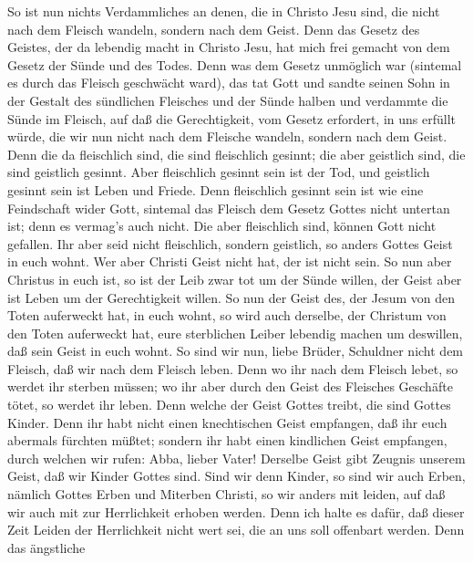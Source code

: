 So ist nun nichts Verdammliches an denen, die in Christo
Jesu sind, die nicht nach dem Fleisch wandeln, sondern nach dem Geist.
 Denn das Gesetz des Geistes, der da lebendig macht in
Christo Jesu, hat mich frei gemacht von dem Gesetz der Sünde und des
Todes.  Denn was dem Gesetz unmöglich war (sintemal es durch
das Fleisch geschwächt ward), das tat Gott und sandte seinen Sohn in der
Gestalt des sündlichen Fleisches und der Sünde halben und verdammte die
Sünde im Fleisch,  auf daß die Gerechtigkeit, vom Gesetz
erfordert, in uns erfüllt würde, die wir nun nicht nach dem Fleische
wandeln, sondern nach dem Geist.  Denn die da fleischlich
sind, die sind fleischlich gesinnt; die aber geistlich sind, die sind
geistlich gesinnt.  Aber fleischlich gesinnt sein ist der
Tod, und geistlich gesinnt sein ist Leben und Friede.  Denn
fleischlich gesinnt sein ist wie eine Feindschaft wider Gott, sintemal
das Fleisch dem Gesetz Gottes nicht untertan ist; denn es vermag's auch
nicht.  Die aber fleischlich sind, können Gott nicht
gefallen.  Ihr aber seid nicht fleischlich, sondern
geistlich, so anders Gottes Geist in euch wohnt. Wer aber Christi Geist
nicht hat, der ist nicht sein.  So nun aber Christus in
euch ist, so ist der Leib zwar tot um der Sünde willen, der Geist aber
ist Leben um der Gerechtigkeit willen.  So nun der Geist
des, der Jesum von den Toten auferweckt hat, in euch wohnt, so wird auch
derselbe, der Christum von den Toten auferweckt hat, eure sterblichen
Leiber lebendig machen um deswillen, daß sein Geist in euch wohnt.
 So sind wir nun, liebe Brüder, Schuldner nicht dem
Fleisch, daß wir nach dem Fleisch leben.  Denn wo ihr nach
dem Fleisch lebet, so werdet ihr sterben müssen; wo ihr aber durch den
Geist des Fleisches Geschäfte tötet, so werdet ihr leben. 
Denn welche der Geist Gottes treibt, die sind Gottes Kinder.
 Denn ihr habt nicht einen knechtischen Geist empfangen,
daß ihr euch abermals fürchten müßtet; sondern ihr habt einen kindlichen
Geist empfangen, durch welchen wir rufen: Abba, lieber Vater!
 Derselbe Geist gibt Zeugnis unserem Geist, daß wir Kinder
Gottes sind.  Sind wir denn Kinder, so sind wir auch Erben,
nämlich Gottes Erben und Miterben Christi, so wir anders mit leiden, auf
daß wir auch mit zur Herrlichkeit erhoben werden.  Denn ich
halte es dafür, daß dieser Zeit Leiden der Herrlichkeit nicht wert sei,
die an uns soll offenbart werden.  Denn das ängstliche
